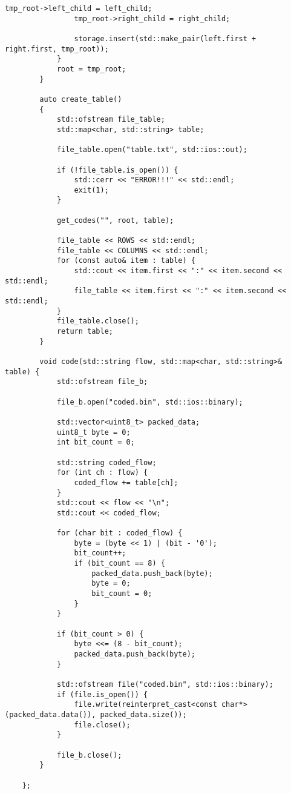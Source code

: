 \begin{lstlisting}[label = list1, caption = Программная реализация описанных алгоритмов структур]
				tmp_root->left_child = left_child;
				tmp_root->right_child = right_child;
				
				storage.insert(std::make_pair(left.first + right.first, tmp_root));
			}
			root = tmp_root;
		}
		
		auto create_table()
		{
			std::ofstream file_table;
			std::map<char, std::string> table;
			
			file_table.open("table.txt", std::ios::out);
			
			if (!file_table.is_open()) {
				std::cerr << "ERROR!!!" << std::endl;
				exit(1);
			}
			
			get_codes("", root, table);
			
			file_table << ROWS << std::endl;
			file_table << COLUMNS << std::endl;
			for (const auto& item : table) {
				std::cout << item.first << ":" << item.second << std::endl;
				file_table << item.first << ":" << item.second << std::endl;
			}
			file_table.close();
			return table;
		}
		
		void code(std::string flow, std::map<char, std::string>& table) {
			std::ofstream file_b;
			
			file_b.open("coded.bin", std::ios::binary);
			
			std::vector<uint8_t> packed_data;
			uint8_t byte = 0;
			int bit_count = 0;
			
			std::string coded_flow;
			for (int ch : flow) {
				coded_flow += table[ch];
			}
			std::cout << flow << "\n";
			std::cout << coded_flow;
			
			for (char bit : coded_flow) {
				byte = (byte << 1) | (bit - '0');
				bit_count++;
				if (bit_count == 8) {
					packed_data.push_back(byte);
					byte = 0;
					bit_count = 0;
				}
			}
			
			if (bit_count > 0) {
				byte <<= (8 - bit_count);
				packed_data.push_back(byte);
			}
			
			std::ofstream file("coded.bin", std::ios::binary);
			if (file.is_open()) {
				file.write(reinterpret_cast<const char*>(packed_data.data()), packed_data.size());
				file.close();
			}
			
			file_b.close();
		}
		
	};
\end{lstlisting}
